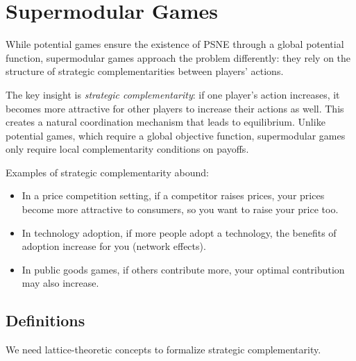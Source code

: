 
\section{Supermodular Games}

While potential games ensure the existence of PSNE through a global potential function, supermodular games approach the problem differently: they rely on the structure of strategic complementarities between players' actions.

The key insight is \textit{strategic complementarity}: if one player's action increases, it becomes more attractive for other players to increase their actions as well. This creates a natural coordination mechanism that leads to equilibrium. Unlike potential games, which require a global objective function, supermodular games only require local complementarity conditions on payoffs.

Examples of strategic complementarity abound:
\begin{itemize}
  \item In a price competition setting, if a competitor raises prices, your prices become more attractive to consumers, so you want to raise your price too.
  \item In technology adoption, if more people adopt a technology, the benefits of adoption increase for you (network effects).
  \item In public goods games, if others contribute more, your optimal contribution may also increase.
\end{itemize}

\subsection{Definitions}

We need lattice-theoretic concepts to formalize strategic complementarity. 

